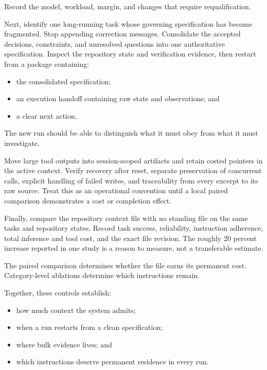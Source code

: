 Record the model, workload, margin, and changes that require requalification.


Next, identify one long-running task whose governing specification has become fragmented. Stop appending correction messages. Consolidate the accepted decisions, constraints, and unresolved questions into one authoritative specification. Inspect the repository state and verification evidence, then restart from a package containing:

\begin{itemize}
\tightlist
\item
  the consolidated specification;
\item
  an execution handoff containing raw state and observations; and
\item
  a clear next action.
\end{itemize}

The new run should be able to distinguish what it must obey from what it must investigate.

Move large tool outputs into session-scoped artifacts and retain costed pointers in the active context. Verify recovery after reset, separate preservation of concurrent calls, explicit handling of failed writes, and traceability from every excerpt to its raw source. Treat this as an operational convention until a local paired comparison demonstrates a cost or completion effect.

Finally, compare the repository context file with no standing file on the same tasks and repository states. Record task success, reliability, instruction adherence, total inference and tool cost, and the exact file revision. The roughly 20 percent increase reported in one study is a reason to measure, not a transferable estimate.

The paired comparison determines whether the file earns its permanent cost. Category-level ablations determine which instructions remain.


Together, these controls establish:

\begin{itemize}
\tightlist
\item
  how much context the system admits;
\item
  when a run restarts from a clean specification;
\item
  where bulk evidence lives; and
\item
  which instructions deserve permanent residence in every run.
\end{itemize}

